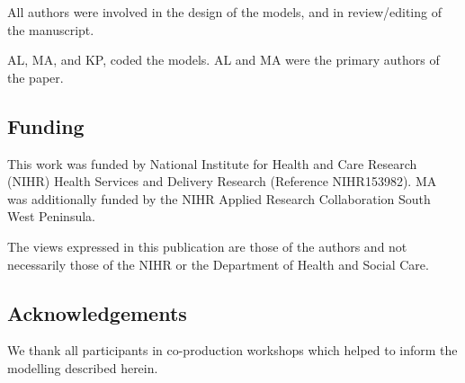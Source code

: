 All authors were involved in the design of the models, and in review/editing of the manuscript.

AL, MA, and KP, coded the models. AL and MA were the primary authors of the paper.


\subsection*{Funding}

This work was funded by National Institute for Health and Care Research (NIHR) Health Services and Delivery Research (Reference NIHR153982). MA was additionally funded by the NIHR Applied Research Collaboration South West Peninsula.

The views expressed in this publication are those of the authors and not necessarily those
of the NIHR or the Department of Health and Social Care.

\subsection*{Acknowledgements}

We thank all participants in co-production workshops which helped to inform the modelling described herein.

